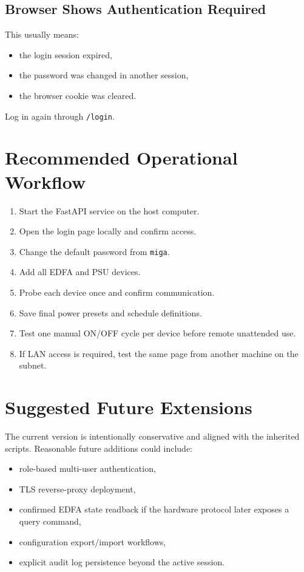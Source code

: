 \documentclass[11pt,a4paper]{article}
\begin{document}
\subsection{Browser Shows Authentication Required}
This usually means:
\begin{itemize}[leftmargin=1.5em]
    \item the login session expired,
    \item the password was changed in another session,
    \item the browser cookie was cleared.
\end{itemize}

Log in again through \texttt{/login}.

\section{Recommended Operational Workflow}
\begin{enumerate}[leftmargin=1.5em]
    \item Start the FastAPI service on the host computer.
    \item Open the login page locally and confirm access.
    \item Change the default password from \texttt{miga}.
    \item Add all EDFA and PSU devices.
    \item Probe each device once and confirm communication.
    \item Save final power presets and schedule definitions.
    \item Test one manual ON/OFF cycle per device before remote unattended use.
    \item If LAN access is required, test the same page from another machine on the subnet.
\end{enumerate}

\section{Suggested Future Extensions}
The current version is intentionally conservative and aligned with the inherited scripts. Reasonable future additions could include:
\begin{itemize}[leftmargin=1.5em]
    \item role-based multi-user authentication,
    \item TLS reverse-proxy deployment,
    \item confirmed EDFA state readback if the hardware protocol later exposes a query command,
    \item configuration export/import workflows,
    \item explicit audit log persistence beyond the active session.
\end{itemize}
\end{document}
